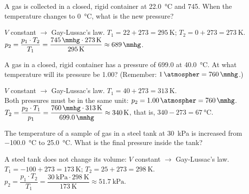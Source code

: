 \begin{exercise}
    A gas is collected in a closed, rigid container at \qty{22.0}{\celsius} and \qty{745}{\mmhg}. When the temperature changes to \qty{0}{\celsius}, what is the new pressure?
    \begin{solu}
        \(V\) constant \(\to\) Gay-Lussac's law. \(T_1 = 22 + 273 = \qty{295}{\kelvin}\); \(T_2 = 0 + 273 = \qty{273}{\kelvin}\). \\
        \(p_2 = \dfrac{p_1 \cdot T_2}{T_1} = \dfrac{\qty{745}{\mmhg} \cdot \qty{273}{\kelvin}}{\qty{295}{\kelvin}} \approx \qty{689}{\mmhg}\).
    \end{solu}
\end{exercise}

\begin{exercise}
    A gas in a closed, rigid container has a pressure of \qty{699.0}{\mmhg} at \qty{40.0}{\celsius}. At what temperature will its pressure be \qty{1.00}{\atmospher}? (Remember: \(\qty{1}{\atmospher} = \qty{760}{\mmhg}\).)
    \begin{solu}
        \(V\) constant \(\to\) Gay-Lussac's law. \(T_1 = 40 + 273 = \qty{313}{\kelvin}\). \\
        Both pressures must be in the same unit: \(p_2 = \qty{1.00}{\atmospher} = \qty{760}{\mmhg}\). \\
        \(T_2 = \dfrac{p_2 \cdot T_1}{p_1} = \dfrac{\qty{760}{\mmhg} \cdot \qty{313}{\kelvin}}{\qty{699.0}{\mmhg}} \approx \qty{340}{\kelvin}\), that is, \(340 - 273 = \qty{67}{\celsius}\).
    \end{solu}
\end{exercise}

\begin{exercise}
    The temperature of a sample of gas in a steel tank at \qty{30}{\kilo\pascal} is increased from \qty{-100.0}{\celsius} to \qty{25.0}{\celsius}. What is the final pressure inside the tank?
    \begin{solu}
        A steel tank does not change its volume: \(V\) constant \(\to\) Gay-Lussac's law. \\
        \(T_1 = -100 + 273 = \qty{173}{\kelvin}\); \(T_2 = 25 + 273 = \qty{298}{\kelvin}\). \\
        \(p_2 = \dfrac{p_1 \cdot T_2}{T_1} = \dfrac{\qty{30}{\kilo\pascal} \cdot \qty{298}{\kelvin}}{\qty{173}{\kelvin}} \approx \qty{51.7}{\kilo\pascal}\).
    \end{solu}
\end{exercise}

